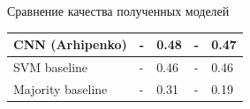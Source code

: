 \documentclass{beamer}
\begin{document}
\begin{frame}{Сравнение качества полученных моделей}
\begin{table}[]
{\begin{tabular}{l|l|l|l|l|}
	\multicolumn{1}{|l|}{CNN (Arhipenko)}                                                                         & -                     & 0.48 & -                                                    & 0.47                                \\ \hline
	\multicolumn{1}{|l|}{SVM baseline}                                                                            & -                     & 0.46 & -                                                    & 0.46                                \\ \hline
	\multicolumn{1}{|l|}{Majority baseline}                                                                       & -                     & 0.31 & -                                                    & 0.19                                \\ \hline
\end{tabular}
}
\end{table}

\end{frame}
\end{document}
